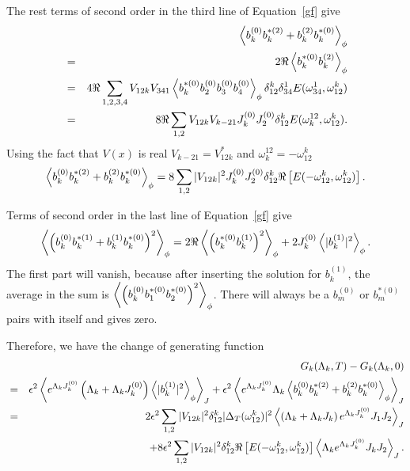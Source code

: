 The rest terms of second order in the third line of Equation~\ref{gf} give
\begin{eqnarray}
		&&\left< b_k^{(0)}b_k^{*(2)}+b_k^{(2)}b_k^{*(0)}\right>_\phi \\
		&=& 2 \Re \left< b_k^{*(0)}b_k^{(2)}\right>_\phi\nonumber \\
		&=&4\Re \sum\limits_{1,2,3,4}V_{12k}V_{341}\left< b_k^{*(0)}b_2^{(0)}b_3^{(0)}b_4^{(0)}\right>_\phi \delta_{12}^k\delta_{34}^1 E(\omega_{34}^{1},\omega_{12}^k)\nonumber\\
		&=&8\Re \sum\limits_{1,2}V_{12k}V_{k-21}J_k^{(0)}J_2^{(0)}\delta_{12}^k E(\omega_{k}^{12},\omega_{12}^k).
\end{eqnarray}
Using the fact that $V(x)$ is real $V_{k-21}= V^*_{12k}$ and $ \omega_{k}^{12}= -\omega_{12}^{k}$
\begin{eqnarray}
	\left< b_k^{(0)}b_k^{*(2)}+b_k^{(2)}b_k^{*(0)}\right>_\phi =8\sum\limits_{1,2}|V_{12k}|^2 J_k^{(0)}J_2^{(0)}\delta_{12}^k \Re\left[E(-\omega_{12}^k,\omega_{12}^k)\right].
\end{eqnarray}

Terms of second order in the last line of Equation~\ref{gf} give
\begin{eqnarray}
		\left< \left(b_k^{(0)}b_k^{*(1)}+b_k^{(1)}b_k^{*(0)}\right)^2\right>_\phi = 2 \Re \left< \left(b_k^{*(0)}b_k^{(1)}\right)^2\right>_\phi +2 J_k^{(0)}\left< |b_k^{(1)}|^2\right>_\phi.
\end{eqnarray}
The first part will vanish, because after inserting the solution for $b_k^{(1)}$, the average in the sum is
$\left< \left(b_k^{(0)}b_1^{*(0)}b_2^{*(0)}\right)^2\right>_\phi$. There will always be a $b_m^{(0)}$ or $b_m^{*(0)}$ pairs with itself and gives zero.

Therefore, we have the change of generating function
\begin{eqnarray}
	&& G_k(\Lambda_k,T)-G_k(\Lambda_k,0) \nonumber\\
	&=&\epsilon^2\left<  e^{\Lambda_k J_k^{(0)}} \left(\Lambda_k +\Lambda_k J_k^{(0)}\right)\left< |b_k^{(1)}|^2\right>_\phi\right>_J +\epsilon^2\left<  e^{\Lambda_k J_k^{(0)}} \Lambda_k \left< b_k^{(0)}b_k^{*(2)}+b_k^{(2)}b_k^{*(0)}\right>_\phi\right>_J\nonumber \\
	&=&2\epsilon^2 \sum\limits_{1,2}|V_{12k}|^2 \delta_{12}^k|\Delta_T(\omega_{12}^{k})|^2 \left< \left( \Lambda_k+\Lambda_k J_k\right)e^{\Lambda_k J_k^{(0)}}J_1 J_2\right>_J\nonumber\\
	&&+8\epsilon^2 \sum\limits_{1,2}|V_{12k}|^2 \delta_{12}^k \Re\left[E(-\omega_{12}^k,\omega_{12}^k)\right]\left< \Lambda_k e^{\Lambda_k J_k^{(0)}}J_k J_2\right>_J.
\end{eqnarray}

